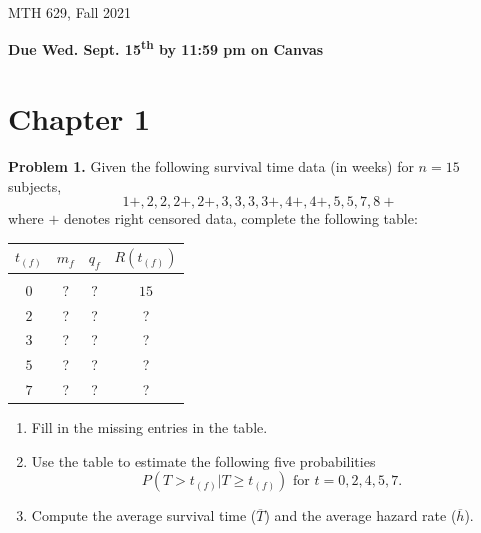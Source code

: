 \documentclass[12pt]{article}
\begin{document}
{
            \hfill {MTH 629, Fall 2021}}
\bigskip

{\bf Due Wed. Sept. 15\textsuperscript{th} by 11:59 pm on Canvas}

\section{Chapter 1}

\textbf{Problem 1.}
Given the following survival time data (in weeks) for $n = 15$ subjects,
$$
1+, 2, 2, 2+, 2+, 3, 3, 3, 3+, 4+, 4+, 5, 5, 7, 8+
$$ where $+$ denotes right censored data, complete the following table:

\begin{center}
\begin{tabular}{ c c c c }
 $t_{(f)}$ & $m_{f}$ & $q_{f}$ & $R(t_{(f)})$ \\
 \hline \\
 $0$ & $?$ & $?$ & $15$ \\
 $2$ &?  &?  &? \\
 $3$ &?  &?  &? \\
 $5$ &?  &?  &? \\
 $7$ &?  &?  &?
\end{tabular}
\end{center}

\begin{enumerate}
\item Fill in the missing entries in the table.
\item Use the table to estimate the following five probabilities
\[
P(T>t_{(f)}|T \ge t_{(f)}) \text{ for } t=0,2,4,5,7.
\]
\item Compute the average survival time ($\overline{T}$) and the average hazard rate ($\overline{h}$).
\end{enumerate}
\end{document}
